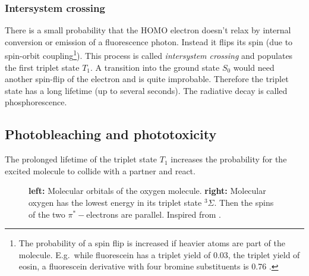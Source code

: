 \subsubsection{Intersystem crossing}
There is a small probability that the HOMO electron doesn't relax by   
internal conversion or emission of a fluorescence photon. Instead it
flips its spin (due to spin-orbit coupling\footnote{The probability of
  a spin flip is increased if heavier atoms are part of the
  molecule. E.g.\ while fluorescein has a triplet yield of 0.03, the
  triplet yield of eosin, a fluorescein derivative with four bromine
  substituents is 0.76 \citep[p.~37]{Sauer2011}.}). This process is
called \emph{intersystem crossing} and populates the first triplet
state $T_1$. A transition into the ground state $S_0$ would need
another spin-flip of the electron and is quite improbable. Therefore
the triplet state has a long lifetime (up to several seconds). The
radiative decay is called phosphorescence.
  

\subsection{Photobleaching and phototoxicity}
The prolonged lifetime of the triplet state $T_1$ increases the      
probability for the excited molecule to collide with a partner and
react.

\begin{figure}[!hbt]
  \centering
%  
  \caption{{\bf left:} Molecular orbitals of the oxygen molecule. {\bf
      right:} Molecular oxygen has the lowest energy in its triplet
    state ${}^3\Sigma$. Then the spins of the two $\pi^*-$electrons
    are parallel. Inspired from \citet{Linde2011a}.}
  \label{fig:oxygen}
\end{figure}


